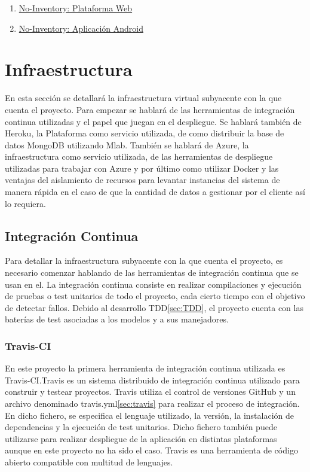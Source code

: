 \documentclass[a4paper,11pt]{book}
\begin{document}
\begin{enumerate}
\item  \href{https://github.com/hugobarzano/NoInventory}{No-Inventory: Plataforma Web}
\item  \href{https://github.com/hugobarzano/NoInventory-Android-Apps}{No-Inventory: Aplicación Android}

\end{enumerate}  


 
\section{Infraestructura}

En esta sección se detallará la infraestructura virtual subyacente con la que cuenta el proyecto. Para empezar se hablará de las herramientas de integración continua utilizadas y el papel que juegan en el despliegue. Se hablará también de Heroku, la Plataforma como servicio utilizada, de como distribuir la base de datos MongoDB utilizando Mlab. También se hablará de Azure, la infraestructura como servicio utilizada, de las herramientas de despliegue utilizadas para trabajar con Azure y por último como utilizar Docker y las ventajas del aislamiento de recursos para levantar instancias del sistema de manera rápida en el caso de que la cantidad de datos a gestionar por el cliente así lo requiera. 

\subsection{Integración Continua}

Para detallar la infraestructura subyacente con la que cuenta el proyecto, es necesario comenzar hablando de las herramientas de integración continua que se usan en el. La integración continua consiste en realizar compilaciones y ejecución de pruebas o test unitarios de todo el proyecto, cada cierto tiempo con el objetivo de detectar fallos. Debido al desarrollo TDD\ref{sec:TDD}, el proyecto cuenta con las baterías de test asociadas a los modelos y a sus manejadores.

\subsubsection{Travis-CI}
En este proyecto la primera herramienta de integración continua utilizada es Travis-CI\cite{travis}.Travis es un  sistema distribuido de integración continua utilizado para construir y testear proyectos. Travis utiliza el control de versiones GitHub y un archivo denominado travis.yml\ref{sec:travis} para realizar el proceso de integración. En dicho fichero, se especifica el lenguaje utilizado, la versión, la instalación de dependencias y la ejecución de test unitarios. Dicho fichero también puede utilizarse para realizar despliegue de la aplicación en distintas plataformas aunque en este proyecto no ha sido el caso. Travis es una herramienta de código abierto compatible con multitud de lenguajes. 
\end{document}

